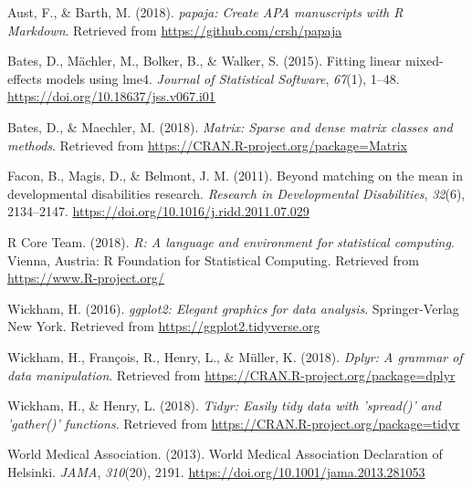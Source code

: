 \documentclass[
  english,
  ,man]{apa6}
\newlength{\cslhangindent}
\newlength{\cslentryspacingunit} %
\newenvironment{CSLReferences}[2] %
 {%
  \setlength{\parindent}{0pt}
  \ifodd #1
  \let\oldpar\par
  \def\par{\hangindent=\cslhangindent\oldpar}
  \fi
  \setlength{\parskip}{#2\cslentryspacingunit}
 }%
 {}
\begin{document}
\hypertarget{refs}{}
\begin{CSLReferences}{1}{0}
\leavevmode{}%
Aust, F., \& Barth, M. (2018). \emph{{papaja}: {Create} {APA} manuscripts with {R Markdown}}. Retrieved from \url{https://github.com/crsh/papaja}

\leavevmode{}%
Bates, D., Mächler, M., Bolker, B., \& Walker, S. (2015). Fitting linear mixed-effects models using {lme4}. \emph{Journal of Statistical Software}, \emph{67}(1), 1--48. \url{https://doi.org/10.18637/jss.v067.i01}

\leavevmode{}%
Bates, D., \& Maechler, M. (2018). \emph{Matrix: Sparse and dense matrix classes and methods}. Retrieved from \url{https://CRAN.R-project.org/package=Matrix}

\leavevmode{}%
Facon, B., Magis, D., \& Belmont, J. M. (2011). {Beyond matching on the mean in developmental disabilities research}. \emph{Research in Developmental Disabilities}, \emph{32}(6), 2134--2147. \url{https://doi.org/10.1016/j.ridd.2011.07.029}

\leavevmode{}%
R Core Team. (2018). \emph{R: A language and environment for statistical computing}. Vienna, Austria: R Foundation for Statistical Computing. Retrieved from \url{https://www.R-project.org/}

\leavevmode{}%
Wickham, H. (2016). \emph{ggplot2: Elegant graphics for data analysis}. Springer-Verlag New York. Retrieved from \url{https://ggplot2.tidyverse.org}

\leavevmode{}%
Wickham, H., François, R., Henry, L., \& Müller, K. (2018). \emph{Dplyr: A grammar of data manipulation}. Retrieved from \url{https://CRAN.R-project.org/package=dplyr}

\leavevmode{}%
Wickham, H., \& Henry, L. (2018). \emph{Tidyr: Easily tidy data with 'spread()' and 'gather()' functions}. Retrieved from \url{https://CRAN.R-project.org/package=tidyr}

\leavevmode{}%
World Medical Association. (2013). {World Medical Association Declaration of Helsinki}. \emph{JAMA}, \emph{310}(20), 2191. \url{https://doi.org/10.1001/jama.2013.281053}

\end{CSLReferences}

\endgroup
\end{document}
